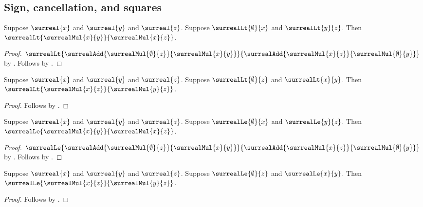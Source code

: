 \subsection{Sign, cancellation, and squares}

\begin{theorem}\label{surreal_pos_mul_lt_left}
    Suppose $\surreal{x}$ and $\surreal{y}$ and $\surreal{z}$.
    Suppose $\surrealLt{\emptyset}{x}$ and $\surrealLt{y}{z}$.
    Then $\surrealLt{\surrealMul{x}{y}}{\surrealMul{x}{z}}$.
\end{theorem}
\begin{proof}
    $\surrealLt
        {\surrealAdd{\surrealMul{\emptyset}{z}}{\surrealMul{x}{y}}}
        {\surrealAdd{\surrealMul{x}{z}}{\surrealMul{\emptyset}{y}}}$
        by .
    Follows by
        .
\end{proof}

\begin{corollary}\label{surreal_pos_mul_lt_right}
    Suppose $\surreal{x}$ and $\surreal{y}$ and $\surreal{z}$.
    Suppose $\surrealLt{\emptyset}{z}$ and $\surrealLt{x}{y}$.
    Then $\surrealLt{\surrealMul{x}{z}}{\surrealMul{y}{z}}$.
\end{corollary}
\begin{proof}
    Follows by
        .
\end{proof}

\begin{theorem}\label{surreal_nonneg_mul_le_left}
    Suppose $\surreal{x}$ and $\surreal{y}$ and $\surreal{z}$.
    Suppose $\surrealLe{\emptyset}{x}$ and $\surrealLe{y}{z}$.
    Then $\surrealLe{\surrealMul{x}{y}}{\surrealMul{x}{z}}$.
\end{theorem}
\begin{proof}
    $\surrealLe
        {\surrealAdd{\surrealMul{\emptyset}{z}}{\surrealMul{x}{y}}}
        {\surrealAdd{\surrealMul{x}{z}}{\surrealMul{\emptyset}{y}}}$
        by .
    Follows by
        .
\end{proof}

\begin{corollary}\label{surreal_nonneg_mul_le_right}
    Suppose $\surreal{x}$ and $\surreal{y}$ and $\surreal{z}$.
    Suppose $\surrealLe{\emptyset}{z}$ and $\surrealLe{x}{y}$.
    Then $\surrealLe{\surrealMul{x}{z}}{\surrealMul{y}{z}}$.
\end{corollary}
\begin{proof}
    Follows by
        .
\end{proof}

